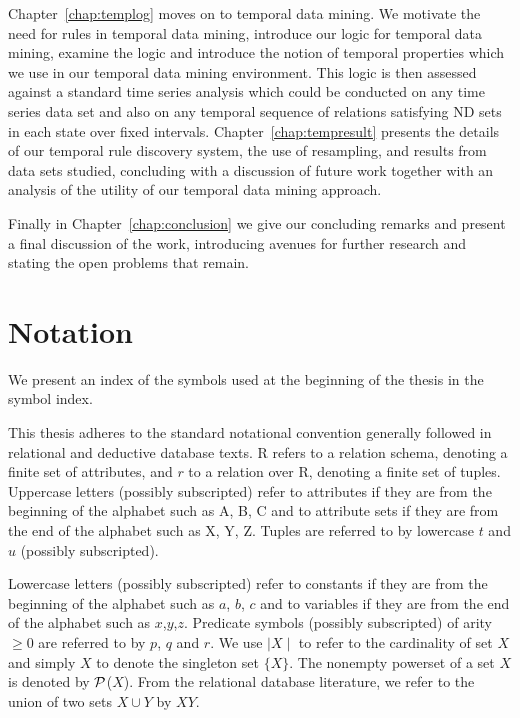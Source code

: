 Chapter~\ref{chap:templog} moves on to temporal data mining. We
motivate the need for rules in temporal data mining, introduce our
logic for temporal data mining, examine the logic and introduce the
notion of temporal properties which we use in our temporal data mining
environment. This logic is then assessed against a standard time series
analysis which could be conducted on any time series data set and also
on any temporal sequence of relations satisfying ND sets in each
state over fixed intervals. Chapter~\ref{chap:tempresult} presents the
details of our temporal 
rule discovery system, the use of resampling, and results from data
sets studied, concluding with a discussion of future work together
with an analysis of the utility of our temporal data mining approach.

\medskip

Finally in Chapter~\ref{chap:conclusion} we give our concluding
remarks and present a final discussion of the work, introducing
avenues for further research and stating the open problems that remain.


\section{Notation}

We present an index of the symbols used at the beginning of the thesis
in the symbol index.

\smallskip

This thesis adheres to the standard notational convention generally followed in
relational and deductive database texts.  R refers to a relation
schema, denoting a finite set of attributes,  and $r$ to a relation over R,
denoting a finite set of tuples.  Uppercase letters (possibly
subscripted) refer to attributes if they are from the beginning of the
alphabet such as A, B, C and to attribute sets if they are from the
end of the alphabet such as X, Y, Z.  Tuples are referred to by
lowercase $t$ and $u$ (possibly subscripted).

\medskip

Lowercase letters (possibly subscripted) refer to constants if they
are from the beginning of the alphabet such as $a$, $b$, $c$ and to
variables if they are from the end of the alphabet such as
$x$,$y$,$z$.  Predicate symbols (possibly subscripted) of arity $\ge
0$ are referred to by $p$, $q$ and $r$. 
We use $\mid X \mid$ to refer to the cardinality of set $X$ and simply
$X$ to denote the singleton set $\{ X \}$. The nonempty powerset of a
set $X$ is denoted by $\cal P$($X$). From the 
relational database literature, we refer to the union of
two sets $X \cup Y$ by $XY$. 


